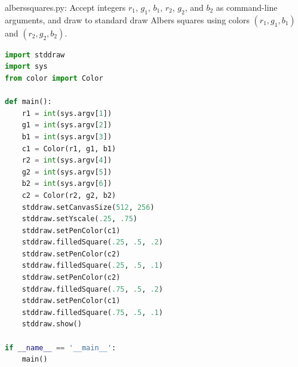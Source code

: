 \documentclass[8pt,a4paper,compress]{beamer}
\begin{document}
\begin{frame}[fragile]
\pause

\begin{framed}
\tiny alberssquares.py: Accept integers $r_1$, $g_1$, $b_1$, $r_2$, $g_2$, and $b_2$ as command-line arguments, and draw to standard draw Albers squares using colors $(r_1, g_1, b_1)$ and $(r_2, g_2, b_2)$.
\end{framed}

\begin{lstlisting}[language=Python,style=focusin]
import stddraw
import sys
from color import Color

def main():
    r1 = int(sys.argv[1])
    g1 = int(sys.argv[2])
    b1 = int(sys.argv[3])
    c1 = Color(r1, g1, b1)
    r2 = int(sys.argv[4])
    g2 = int(sys.argv[5])
    b2 = int(sys.argv[6])
    c2 = Color(r2, g2, b2)
    stddraw.setCanvasSize(512, 256)
    stddraw.setYscale(.25, .75)
    stddraw.setPenColor(c1)
    stddraw.filledSquare(.25, .5, .2)
    stddraw.setPenColor(c2)
    stddraw.filledSquare(.25, .5, .1)
    stddraw.setPenColor(c2)
    stddraw.filledSquare(.75, .5, .2)
    stddraw.setPenColor(c1)
    stddraw.filledSquare(.75, .5, .1)
    stddraw.show()

if __name__ == '__main__':
    main()
\end{lstlisting}
\end{frame}
\end{document}
